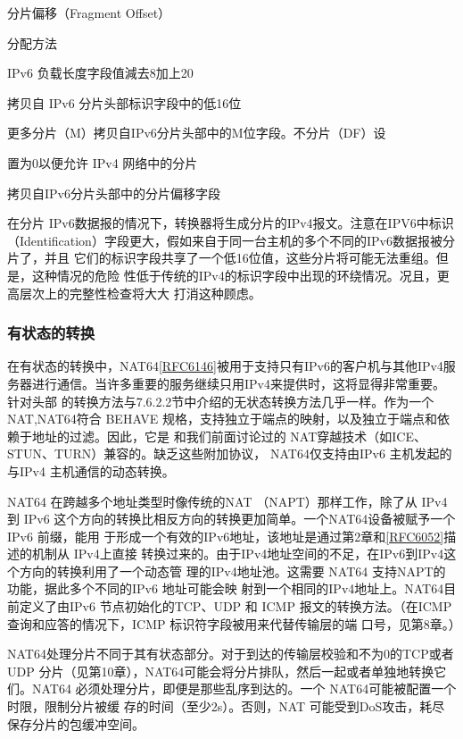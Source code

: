分片偏移（Fragment Offset）

分配方法

IPv6 负载长度字段值減去8加上20

拷贝自 IPv6 分片头部标识字段中的低16位

更多分片（M）拷贝自IPv6分片头部中的M位字段。不分片（DF）设

置为0以便允许 IPv4 网络中的分片

拷贝自IPv6分片头部中的分片偏移字段

在分片 IPv6数据报的情况下，转换器将生成分片的IPv4报文。注意在IPV6中标识
（Identification）字段更大，假如来自于同一台主机的多个不同的IPv6数据报被分片了，并且
它们的标识字段共享了一个低16位值，这些分片将可能无法重组。但是，这种情况的危险
性低于传统的IPv4的标识字段中出现的环绕情况。况且，更高层次上的完整性检查将大大
打消这种顾虑。

\subsubsection{有状态的转换}

在有状态的转换中，NAT64\href{https://www.rfc-editor.org/rfc/rfc6146}{[RFC6146]}被用于支持只有IPv6的客户机与其他IPv4服
务器进行通信。当许多重要的服务继续只用IPv4来提供时，这将显得非常重要。针对头部
的转换方法与7.6.2.2节中介绍的无状态转换方法几乎一样。作为一个 NAT,NAT64符合
BEHAVE 规格，支持独立于端点的映射，以及独立于端点和依赖于地址的过滤。因此，它是
和我们前面讨论过的 NAT穿越技术（如ICE、STUN、TURN）兼容的。缺乏这些附加协议，
NAT64仅支持由IPv6 主机发起的与IPv4 主机通信的动态转换。

NAT64 在跨越多个地址类型时像传统的NAT （NAPT）那样工作，除了从 IPv4到 IPv6
这个方向的转换比相反方向的转换更加简单。一个NAT64设备被赋予一个 IPv6 前缀，能用
于形成一个有效的IPv6地址，该地址是通过第2章和\href{https://www.rfc-editor.org/rfc/rfc6052}{[RFC6052]}描述的机制从 IPv4上直接
转换过来的。由于IPv4地址空间的不足，在IPv6到IPv4这个方向的转换利用了一个动态管
理的IPv4地址池。这需要 NAT64 支持NAPT的功能，据此多个不同的IPv6 地址可能会映
射到一个相同的IPv4地址上。NAT64目前定义了由IPv6 节点初始化的TCP、UDP 和 ICMP
报文的转换方法。（在ICMP 查询和应答的情况下，ICMP 标识符字段被用来代替传输层的端
口号，见第8章。）

NAT64处理分片不同于其有状态部分。对于到达的传输层校验和不为0的TCP或者
UDP 分片（见第10章），NAT64可能会将分片排队，然后一起或者单独地转换它们。NAT64
必须处理分片，即便是那些乱序到达的。一个 NAT64可能被配置一个时限，限制分片被缓
存的时间（至少2s）。否则，NAT 可能受到DoS攻击，耗尽保存分片的包缓冲空间。

